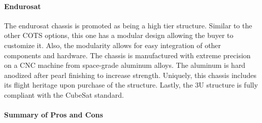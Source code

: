 \paragraph{Endurosat}
The endurosat chassis is promoted as being a high tier structure. Similar to the other COTS options, this one has a modular design allowing the buyer to customize it. Also, the modularity allows for easy integration of other components and hardware. The chassis is manufactured with extreme precision on a CNC machine from space-grade aluminum alloys. The aluminum is hard anodized after pearl finishing to increase strength. Uniquely, this chassis includes its flight heritage upon purchase of the structure. Lastly, the 3U structure is fully compliant with the CubeSat standard.\cite{enduro_sat} 

\paragraph{Summary of Pros and Cons}
